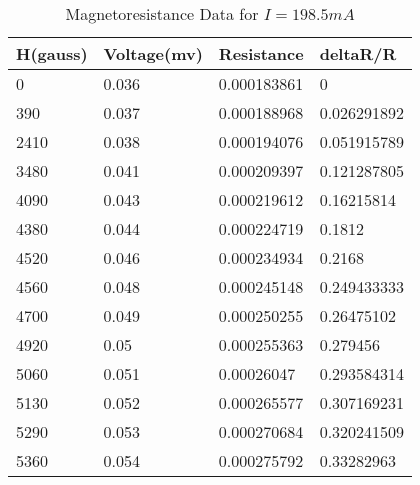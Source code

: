 \begin{table}[]
	\centering
	\begin{tabular}{|l|l|l|l|}
	\hline
		H(gauss) & Voltage(mv) & Resistance & deltaR/R \\ \hline
		0 & 0.036 & 0.000183861 & 0 \\ \hline
		390 & 0.037 & 0.000188968 & 0.026291892 \\ \hline
		2410 & 0.038 & 0.000194076 & 0.051915789 \\ \hline
		3480 & 0.041 & 0.000209397 & 0.121287805 \\ \hline
		4090 & 0.043 & 0.000219612 & 0.16215814 \\ \hline
		4380 & 0.044 & 0.000224719 & 0.1812 \\ \hline
		4520 & 0.046 & 0.000234934 & 0.2168 \\ \hline
		4560 & 0.048 & 0.000245148 & 0.249433333 \\ \hline
		4700 & 0.049 & 0.000250255 & 0.26475102 \\ \hline
		4920 & 0.05 & 0.000255363 & 0.279456 \\ \hline
		5060 & 0.051 & 0.00026047 & 0.293584314 \\ \hline
		5130 & 0.052 & 0.000265577 & 0.307169231 \\ \hline
		5290 & 0.053 & 0.000270684 & 0.320241509 \\ \hline
		5360 & 0.054 & 0.000275792 & 0.33282963 \\ \hline
	\end{tabular}
	\caption{Magnetoresistance Data for $I=198.5mA$}
	\label{tab:mag1}
\end{table}